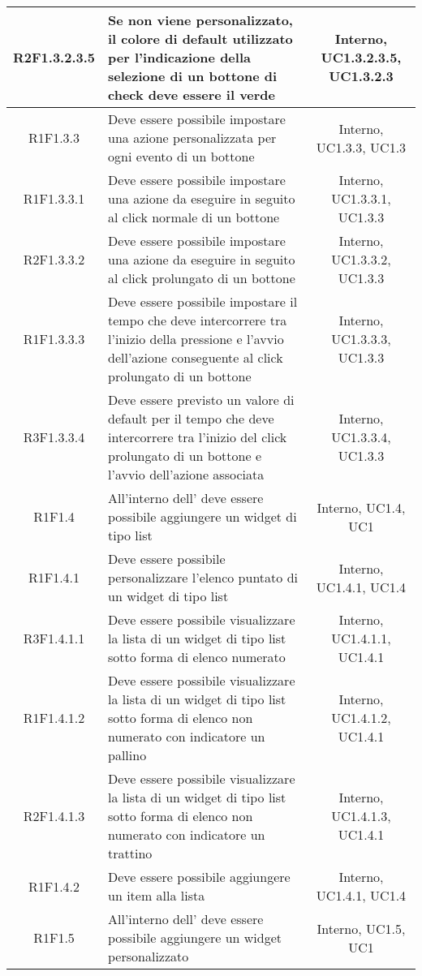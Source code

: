 \begin{longtable}{|c|>{\centering}m{7cm}|c|}
		\hline
		R2F1.3.2.3.5 & Se non viene personalizzato, il colore di default utilizzato per l'indicazione della selezione di un bottone di check deve essere il verde & Interno, UC1.3.2.3.5, UC1.3.2.3 \\
		\hline
			R1F1.3.3 & Deve essere possibile impostare una azione personalizzata per ogni evento di un bottone & Interno, UC1.3.3, UC1.3 \\
			\hline
		R1F1.3.3.1 & Deve essere possibile impostare una azione da eseguire in seguito al click normale di un bottone & Interno, UC1.3.3.1, UC1.3.3\\ 
		\hline
		R2F1.3.3.2 & Deve essere possibile impostare una azione da eseguire in seguito al click prolungato di un bottone & Interno, UC1.3.3.2, UC1.3.3\\ 
		\hline
		R1F1.3.3.3 & Deve essere possibile impostare il tempo che deve intercorrere tra l'inizio della pressione e l'avvio dell'azione conseguente al click prolungato di un bottone & Interno, UC1.3.3.3, UC1.3.3\\ 
		\hline
		R3F1.3.3.4 & Deve essere previsto un valore di default per il tempo che deve intercorrere tra l'inizio del click prolungato di un bottone e l'avvio dell'azione associata & Interno, UC1.3.3.4, UC1.3.3\\ 
		\hline
		R1F1.4 & All'interno dell'\termine{SDK} deve essere possibile aggiungere un widget di tipo list & Interno, UC1.4, UC1 \\ 
		\hline
		R1F1.4.1 & Deve essere possibile personalizzare l'elenco puntato di un widget di tipo list & Interno, UC1.4.1, UC1.4 \\
		\hline
		R3F1.4.1.1 & Deve essere possibile visualizzare la lista di un widget di tipo list sotto forma di elenco numerato & Interno, UC1.4.1.1, UC1.4.1 \\
		\hline
		R1F1.4.1.2 & Deve essere possibile visualizzare la lista di un widget di tipo list sotto forma di elenco non numerato con indicatore un pallino & Interno, UC1.4.1.2, UC1.4.1 \\
		\hline
		R2F1.4.1.3 & Deve essere possibile visualizzare la lista di un widget di tipo list sotto forma di elenco non numerato con indicatore un trattino & Interno, UC1.4.1.3, UC1.4.1 \\
		\hline
		R1F1.4.2 & Deve essere possibile aggiungere un item alla lista & Interno, UC1.4.1, UC1.4 \\
		\hline
		\hline	
		R1F1.5 & All'interno dell'\termine{SDK} deve essere possibile aggiungere un widget personalizzato & Interno, UC1.5, UC1 \\ 

\end{longtable}
